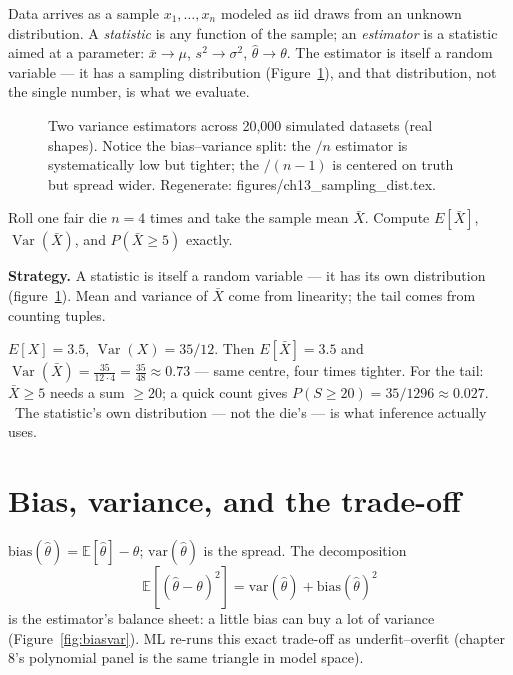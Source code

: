 Data arrives as a sample $x_1,\dots,x_n$ modeled as iid draws from an
unknown distribution. A \emph{statistic} is any function
of the sample; an \emph{estimator} is a statistic aimed
at a parameter: $\bar x\to\mu$, $s^{2}\to\sigma^{2}$,
$\hat\theta\to\theta$. The estimator is itself a random variable --- it
has a sampling distribution (Figure~\ref{fig:samplingdist}), and that
distribution, not the single number, is what we evaluate.

\begin{figure}[htbp]
\centering

\caption{Two variance estimators across 20{,}000 simulated datasets
(real shapes). Notice the bias--variance split: the $/n$ estimator is
systematically low but tighter; the $/(n-1)$ is centered on truth but
spread wider. Regenerate: \ttfamily figures/ch13\_sampling\_dist.tex.}
\label{fig:samplingdist}
\end{figure}

\begin{example}\label{ex:sampdist}
Roll one fair die $n=4$ times and take the sample mean $\bar X$.
Compute $E[\bar X]$, $\operatorname{Var}(\bar X)$, and
$P(\bar X\geq5)$ exactly.
\par\smallskip
\textbf{Strategy.} A statistic is itself a random variable --- it has
its own distribution (figure~\ref{fig:samplingdist}). Mean and variance of
$\bar X$ come from linearity; the tail comes from counting
tuples.
\begin{solution}
$E[X]=3.5$, $\operatorname{Var}(X)=35/12$. Then $E[\bar X]=3.5$ and
$\operatorname{Var}(\bar X)=\frac{35}{12\cdot4}=\frac{35}{48}\approx
0.73$ --- same centre, four times tighter. For the tail:
$\bar X\geq5$ needs a sum $\geq20$; a quick count gives
$P(S\geq20)=35/1296\approx0.027$. \checkmark\ The statistic's own
distribution --- not the die's --- is what inference actually uses.
\end{solution}
\end{example}

\section{Bias, variance, and the trade-off}\label{sec:stats-bv}

$\mathrm{bias}(\hat\theta)=\mathbb E[\hat\theta]-\theta$;
$\mathrm{var}(\hat\theta)$ is the spread. The decomposition
\[
\mathbb E[(\hat\theta-\theta)^{2}]
=\mathrm{var}(\hat\theta)+\mathrm{bias}(\hat\theta)^{2}
\]
is the estimator's balance sheet: a little bias can buy a lot of variance
(Figure~\ref{fig:biasvar}). ML re-runs this exact trade-off as
underfit--overfit (chapter 8's polynomial panel is the same triangle in
model space).

